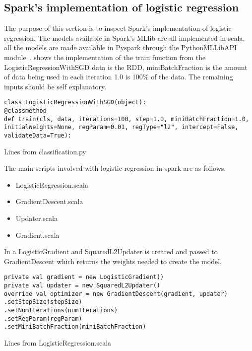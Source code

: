 \subsection{Spark's implementation of logistic regression}\label{sec:sparklogreg}


The purpose of this section is to inspect Spark’s implementation of logistic regression.
The models available in Spark's MLlib are all implemented in scala, all the models are made available in Pyspark through the PythonMLLibAPI module~\cite{hadoopIntro}.
 shows the implementation of the train function from the LogisticRegressionWithSGD data is the RDD, miniBatchFraction is the amount of data being used in each iteration 1.0 is 100\% of the data. The remaining inputs should be self explanatory.   
\begin{listing}[H]
\begin{verbatim}
class LogisticRegressionWithSGD(object):
@classmethod
def train(cls, data, iterations=100, step=1.0, miniBatchFraction=1.0,
initialWeights=None, regParam=0.01, regType="l2", intercept=False,
validateData=True):
\end{verbatim}
\caption{Lines from classification.py}
\label{lst:py_logreg}
\end{listing}
The main scripts involved with logistic regression in spark are as follows.
\begin{itemize}
\item LogisticRegression.scala
\item GradientDescent.scala
\item Updater.scala
\item Gradient.scala
\end{itemize}
In  a LogisticGradient and SquaredL2Updater is created and passed to GradientDescent which returns the weights needed to create the model.
\begin{listing}[H]
\begin{verbatim}
private val gradient = new LogisticGradient()
private val updater = new SquaredL2Updater()
override val optimizer = new GradientDescent(gradient, updater)
.setStepSize(stepSize)
.setNumIterations(numIterations)
.setRegParam(regParam)
.setMiniBatchFraction(miniBatchFraction)
\end{verbatim}
\caption{Lines from LogisticRegression.scala}
\label{lst:gd_logreg}
\end{listing}

